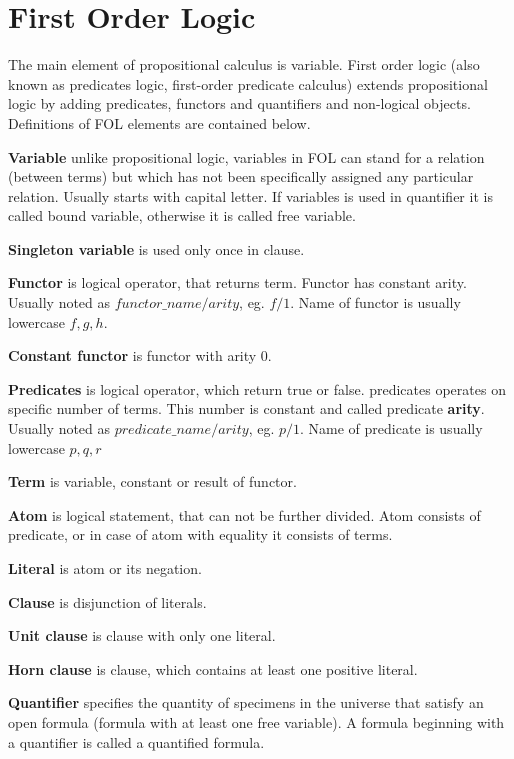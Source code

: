 \section{First Order Logic}

The main element of propositional calculus is variable. First order logic (also known as predicates logic, first-order predicate calculus) extends propositional logic by adding predicates, functors and quantifiers and non-logical objects. Definitions of FOL elements are contained below.

\textbf{Variable}
unlike propositional logic, variables in \gls{FOL} can stand for a relation (between terms) but which has not been specifically assigned any particular relation.
Usually starts with capital letter. If variables is used in quantifier it is called bound variable, otherwise it is called free variable.

\textbf{Singleton variable}
is used only once in clause.

\textbf{Functor}
is logical operator, that returns term. Functor has constant arity. Usually noted as $functor\_name/arity$, eg. $f/1$. Name of functor  is usually lowercase $f, g, h$.

\textbf{Constant functor}
is functor with arity 0.

\textbf{Predicates}
is logical operator, which return true or false. predicates operates on specific number of terms. This number is constant and called predicate \textbf{arity}. Usually noted as $predicate\_name/arity$, eg. $p/1$. Name of predicate is usually lowercase $p, q, r $

\textbf{Term}
is variable, constant or result of functor.

\textbf{Atom}
is logical statement, that can not be further divided. Atom consists of predicate, or in case of atom with equality it consists of terms.

\textbf{Literal}
is atom or its negation.

\textbf{Clause}
is disjunction of literals.

\textbf{Unit clause}
is clause with only one literal.

\textbf{Horn clause}
is clause, which contains at least one positive literal.

\textbf{Quantifier}
specifies the quantity of specimens in the universe that satisfy an open formula (formula with at least one free variable). A formula beginning with a quantifier is called a quantified formula.

